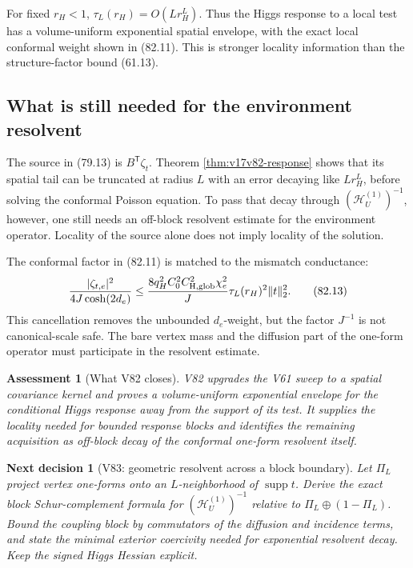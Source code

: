 \documentclass[11pt]{article}
\newtheorem{decision}[theorem]{Next decision}
\newtheorem{assessment}[theorem]{Assessment}
\theoremstyle{remark}
\begin{document}
For fixed \(r_H<1\),
\(\tau_L(r_H)=O(Lr_H^L)\).  Thus the Higgs response to a local test
has a volume-uniform exponential spatial envelope, with the exact
local conformal weight shown in (82.11).  This is stronger locality
information than the structure-factor bound (61.13).

\subsection{What is still needed for the environment resolvent}

The source in (79.13) is \(B^{\mathsf T}\zeta_t\).  Theorem
\ref{thm:v17v82-response} shows that its spatial tail can be truncated
at radius \(L\) with an error decaying like \(Lr_H^L\), before solving
the conformal Poisson equation.  To pass that decay through
\((\mathscr H_U^{(1)})^{-1}\), however, one still needs an off-block
resolvent estimate for the environment operator.  Locality of the
source alone does not imply locality of the solution.

The conformal factor in (82.11) is matched to the mismatch conductance:
\[
 \frac{|\zeta_{t,e}|^2}{4J\cosh(2d_e)}
 \leq
 \frac{8q_H^2C_0^2C_{\rm H,glob}^2\chi_e^2}{J}
 \tau_L(r_H)^2\|t\|_2^2.                         \tag{82.13}
\]
This cancellation removes the unbounded \(d_e\)-weight, but the
factor \(J^{-1}\) is not canonical-scale safe.  The bare vertex mass
and the diffusion part of the one-form operator must participate in
the resolvent estimate.

\begin{assessment}[What V82 closes]
\label{ass:v17v82-status}
V82 upgrades the V61 sweep to a spatial covariance kernel and proves a
volume-uniform exponential envelope for the conditional Higgs response
away from the support of its test.  It supplies the locality needed for
bounded response blocks and identifies the remaining acquisition as
off-block decay of the conformal one-form resolvent itself.
\end{assessment}

\begin{decision}[V83: geometric resolvent across a block boundary]
\label{dec:v17v82-next}
Let \(\Pi_L\) project vertex one-forms onto an \(L\)-neighborhood of
\(\operatorname{supp}t\).  Derive the exact block Schur-complement
formula for \((\mathscr H_U^{(1)})^{-1}\) relative to
\(\Pi_L\oplus(1-\Pi_L)\).  Bound the coupling block by commutators of
the diffusion and incidence terms, and state the minimal exterior
coercivity needed for exponential resolvent decay.  Keep the signed
Higgs Hessian explicit.
\end{decision}
\end{document}
